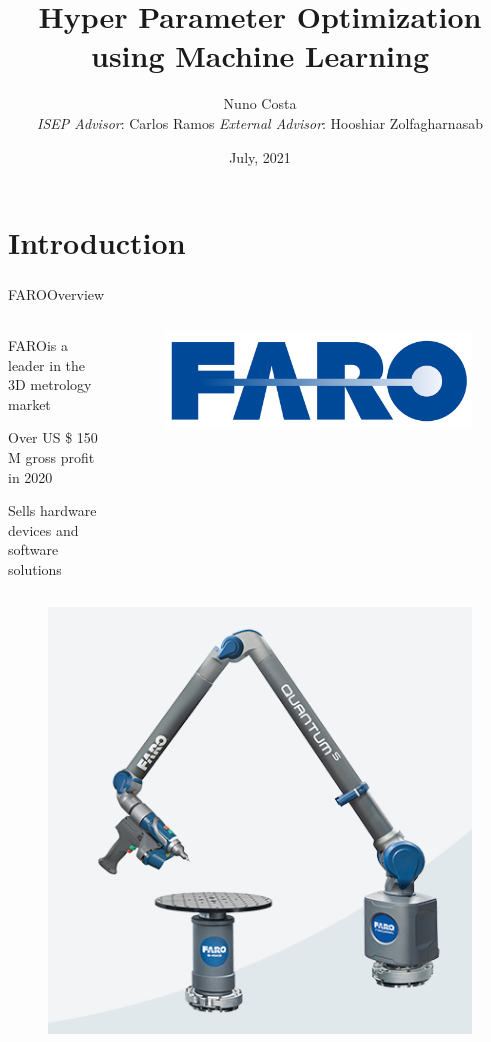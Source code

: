 \documentclass[10pt]{beamer}
\title{Hyper Parameter Optimization \newline using Machine Learning}
\date{July, 2021}
\author{{Nuno Costa} \texorpdfstring{ \\
{\textit{ISEP Advisor}: Carlos Ramos} \newline
{\textit{External Advisor}: Hooshiar Zolfagharnasab}}{}}
\institute{Polytechnic of Porto - School of Engineering (ISEP)}
\newcommand{\faro}[0]{FARO\textsuperscript{\textregistered}\space}
\begin{document}
  \maketitle
  \section{Introduction}
  \begin{frame}{\faro Overview}
    \vspace{1cm}
    \begin{columns}
      \begin{column}{0.7\textwidth}
          \faro is a leader in the 3D metrology market 

          Over US \$ 150 M gross profit in 2020

          Sells hardware devices and software solutions
      \end{column}
      \begin{column}{0.3\textwidth}
        \begin{figure}
        \centering
        \includegraphics[width=\textwidth]{images/faro_logo.png}
        \end{figure}
      \end{column}
    \end{columns}
    \begin{columns}
      \begin{column}{0.30\textwidth}
        \begin{figure}
          \centering
          \includegraphics[width=\textwidth]{images/faro_quantum_s_arm.png}

\end{figure}
\end{column}
\end{columns}
\end{frame}
\end{document}
